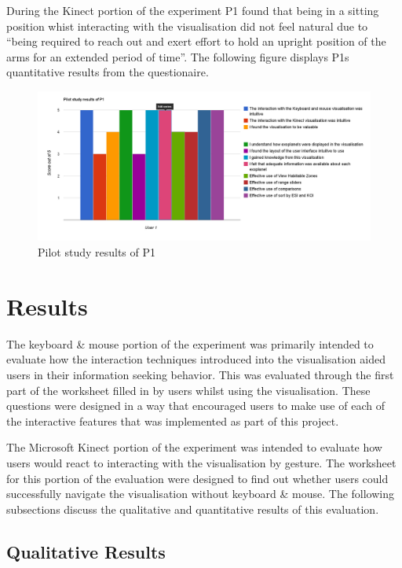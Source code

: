 During the Kinect portion of the experiment P1 found that being in a sitting
position whist interacting with the visualisation did not feel natural due to
``being required to reach out and exert effort to hold an upright position of
the arms for an extended period of time''. The following figure displays P1s
quantitative results from the questionaire.
\begin{figure}[H]
  \centering
      \includegraphics[width=1\textwidth]{images/pilot.jpg}
  \caption{Pilot study results of P1}  
    \label{fig:pilot}
\end{figure}

\section{Results}
The keyboard \& mouse portion of the experiment was primarily intended to
evaluate how the interaction techniques introduced into the
visualisation aided users in their information seeking behavior.
This was evaluated through the first part of the worksheet filled
in by users whilst using the visualisation. These questions were designed in a
way that
encouraged users to make use of each of the interactive features that was
implemented as part of this project.

The Microsoft Kinect portion of the experiment was intended to evaluate how
users would react to interacting with the visualisation by gesture. The
worksheet for this portion of the evaluation were designed to find out whether
users could successfully navigate the visualisation without keyboard \& mouse.
The following subsections discuss the qualitative and quantitative results of
this evaluation. 

\subsection{Qualitative Results}
